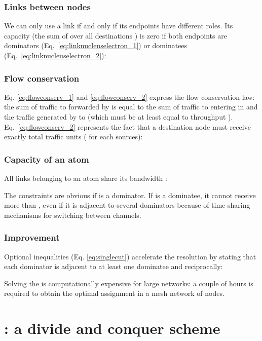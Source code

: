 \documentclass[twoside]{article}
\begin{document}
\subsubsection{Links between nodes} 
We can only use a link if and only if its endpoints have different roles. Its capacity (the sum of  over all
destinations ) is zero if both endpoints are dominators (Eq.~\ref{eq:linknucleuselectron_1}) or dominatees (Eq.~\ref{eq:linknucleuselectron_2}):
\setlength{\arraycolsep}{0.0em}





\subsubsection{Flow conservation}
Eq. \ref{eq:flowconserv_1} and \ref{eq:flowconserv_2} express the flow
conservation law: the sum of traffic to  forwarded by  is equal to
the sum of traffic to  entering in  and the traffic generated by
 to  (which must be at least equal to throughput
). Eq.~\ref{eq:flowconserv_2} represents the fact that a
destination node must receive exactly  total
traffic units ( for each  sources):





\subsubsection{Capacity of an atom}
All links belonging to an atom share its bandwidth :

The constraints are obvious if  is a dominator. If  is a
dominatee, it cannot receive more than \capa, even if it is adjacent
to several dominators because of time sharing mechanisms for switching
between channels.

\subsubsection{Improvement}
Optional inequalities (Eq. \ref{eq:singlecut}) accelerate the \milp
resolution by stating that each dominator is adjacent to at least one
dominatee and reciprocally:


Solving the \milp is computationally expensive for large networks: a
couple of hours is required to obtain the optimal assignment in a mesh
network of  nodes.




\section{\potatoes: a divide and conquer scheme}
\label{section:potatoes_description}
\end{document}
